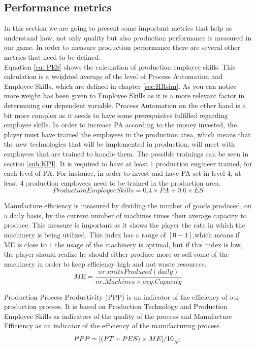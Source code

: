 \subsection{Performance metrics}
\label{sub:PM}
In this section we are going to present some important metrics that help us understand how, not only quality but also production performance is measured in our game. In order to measure production performance there are several other metrics that need to be defined. \\
Equation \ref{eq: PES} shows the calculation of production employee skills. This calculation is a weighted average of the level of Process Automation and Employee Skills, which are defined in chapter \ref{sec:HRsim}. As you can notice more weight has been given to Employee Skills as it is a more relevant factor in determining our dependent variable. Process Automation on the other hand is a bit more complex as it needs to have some prerequisites fulfilled regarding employee skills. In order to increase PA according to the money invested, the player must have trained the employees in the production area, which means that the new technologies that will be implemented in production, will meet with employees that are trained to handle them. The possible trainings can be seen in section \ref{sub:KPI}. It is required to have at least $1$ production engineer trained, for each level of PA. For instance, in order to invest and have PA set in level $4$, at least $4$ production employees need to be trained in the production area.
\begin{equation}
Production Employee Skills= 0.4\times PA + 0.6\times ES
\label{eq: PES}
\end{equation}

Manufacture efficiency is measured by dividing the number of goods produced, on a daily basis, by the current number of machines times their average capacity to produce. This measure is important as it shows the player the rate in which the machinery is being utilized. This index has a range of $[0-1]$,which means if ME is close to $1$ the usage of the machinery is optimal, but if this index is low, the player should realize he should either produce more or sell some of the machinery in order to keep efficiency high and not waste resources.
\begin{equation}
ME= \frac{nr. units Produced(daily)}{nr. Machines\times avg. Capacity}  
\label{eq: ME}
\end{equation}

Production Process Productivity (PPP) is an indicator of the efficiency of our production  process. It is based on Production Technology and Production Employee Skills as indicators of the quality of the process and Manufacture Efficiency as an indicator of the efficiency of the manufacturing process.
\begin{equation}
PPP= [(PT + PES) \times ME]/10_{N\footnotemark}
\label{eq:PPP}
\end{equation}

